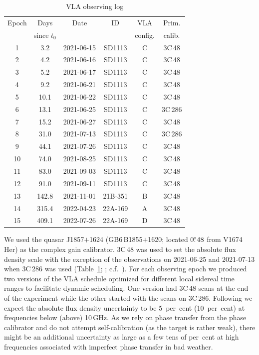 \documentclass[a4paper,fleqn,usenatbib]{mnras}
\newcommand{\nova}{V1674\,Her}
\begin{document}
\begin{table}
\begin{center}
\caption{VLA observing log}
\label{tab:vlaobslog}
\begin{tabular}{cccccc}
\hline\hline
Epoch & Days & Date     & ID      & VLA   & Prim. \\
      & since $t_0$ &   &         & config. & calib.  \\
\hline
 1 &   3.2 & 2021-06-15 & SD1113  &  C & 3C\,48 \\
 2 &   4.2 & 2021-06-16 & SD1113  &  C & 3C\,48 \\
 3 &   5.2 & 2021-06-17 & SD1113  &  C & 3C\,48 \\
 4 &   9.2 & 2021-06-21 & SD1113  &  C & 3C\,48 \\
 5 &  10.1 & 2021-06-22 & SD1113  &  C & 3C\,48 \\
 6 &  13.1 & 2021-06-25 & SD1113  &  C & 3C\,286 \\
 7 &  15.2 & 2021-06-27 & SD1113  &  C & 3C\,48 \\
 8 &  31.0 & 2021-07-13 & SD1113  &  C & 3C\,286 \\
 9 &  44.1 & 2021-07-26 & SD1113  &  C & 3C\,48 \\
10 &  74.0 & 2021-08-25 & SD1113  &  C & 3C\,48 \\
11 &  83.0 & 2021-09-03 & SD1113  &  C & 3C\,48 \\
12 &  91.0 & 2021-09-11 & SD1113  &  C & 3C\,48 \\
13 & 142.8 & 2021-11-01 & 21B-351 &  B & 3C\,48 \\
14 & 315.4 & 2022-04-23 & 22A-169 &  A & 3C\,48 \\
15 & 409.1 & 2022-07-26 & 22A-169 &  D & 3C\,48 \\
\hline
\end{tabular}
\begin{flushleft}
\end{flushleft}
\end{center}
\end{table}

We used the quasar J1857$+$1624 (GB6\,B1855$+$1620; located $0\hbox{$.\!\!^\circ$}48$ 
from \nova{}) as the complex gain 
calibrator. 3C\,48 was used to set the absolute flux density scale with the
exception of the observations on 2021-06-25 and 2021-07-13 when 3C\,286 was
used (Table~\ref{tab:vlaobslog}; \citealt{2017ApJS..230....7P}; c.f.~\citealt{1987A&A...183...38T}). 
For each observing epoch we produced two versions of the VLA schedule optimized 
for different local sidereal time ranges to facilitate dynamic scheduling. 
One version had 3C\,48 scans at the end of the experiment while the other started 
with the scans on 3C\,286. 
%
Following \cite{2021ApJS..257...49C} we expect the absolute flux density uncertainty to be
5~per~cent (10~per~cent) at frequencies below (above) 10\,GHz. As we rely on phase transfer
from the phase calibrator and do not attempt self-calibration (as the target
is rather weak), there might be an additional uncertainty as large as a few
tens of per~cent at high frequencies associated with imperfect phase
transfer in 
bad weather.
\end{document}
